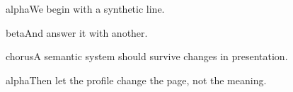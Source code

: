 \begin{PSESpeech}{alpha}We begin with a synthetic line.\end{PSESpeech}
\begin{PSESpeech}{beta}And answer it with another.\end{PSESpeech}
\begin{PSESpeech}{chorus}A semantic system should survive changes in presentation.\end{PSESpeech}
\begin{PSESpeech}{alpha}Then let the profile change the page, not the meaning.\end{PSESpeech}

